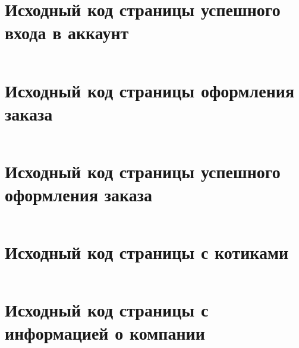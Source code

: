 \documentclass[a4paper, 14pt]{extarticle}
\newenvironment{code}{\captionsetup{type=listing}}{}
\begin{document}
\newpage

\section{Исходный код страницы успешного входа в аккаунт}
\label{app:login-success.html}

\begin{code}
  \inputminted{html}{../task-1/login-success.html}
\end{code}

\newpage

\section{Исходный код страницы оформления заказа}
\label{app:order.html}

\begin{code}
  \inputminted{html}{../task-1/order.html}
\end{code}

\newpage

\section{Исходный код страницы успешного оформления заказа}
\label{app:order-success.html}

\begin{code}
  \inputminted{html}{../task-1/order-success.html}
\end{code}

\newpage

\section{Исходный код страницы с котиками}
\label{app:cats.html}

\begin{code}
  \inputminted{html}{../task-1/cats.html}
\end{code}

\newpage

\section{Исходный код страницы с информацией о компании}
\label{app:about.html}

\begin{code}
  \inputminted{html}{../task-1/about.html}
\end{code}
\end{document}
